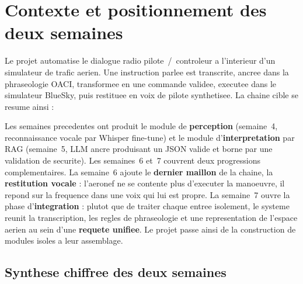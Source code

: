 \documentclass[11pt,a4paper]{article}
\begin{document}
\tableofcontents
\thispagestyle{fancy}
\vspace{1cm}

\section{Contexte et positionnement des deux semaines}

Le projet automatise le dialogue radio pilote~/~controleur a l'interieur d'un
simulateur de trafic aerien. Une instruction parlee est transcrite, ancree dans la
phraseologie OACI, transformee en une commande validee, executee dans le simulateur
BlueSky, puis restituee en voix de pilote synthetisee. La chaine cible se resume
ainsi :

\begin{center}
\end{center}

Les semaines precedentes ont produit le module de \textbf{perception} (semaine~4,
reconnaissance vocale par Whisper fine-tune) et le module d'\textbf{interpretation}
par RAG (semaine~5, LLM ancre produisant un JSON valide et borne par une validation de
securite). Les semaines~6 et~7 couvrent deux progressions complementaires. La
semaine~6 ajoute le \textbf{dernier maillon} de la chaine, la \textbf{restitution
vocale} : l'aeronef ne se contente plus d'executer la manoeuvre, il repond sur la
frequence dans une voix qui lui est propre. La semaine~7 ouvre la phase
d'\textbf{integration} : plutot que de traiter chaque entree isolement, le systeme
reunit la transcription, les regles de phraseologie et une representation de l'espace
aerien au sein d'une \textbf{requete unifiee}. Le projet passe ainsi de la
construction de modules isoles a leur assemblage.

\subsection{Synthese chiffree des deux semaines}
\end{document}
